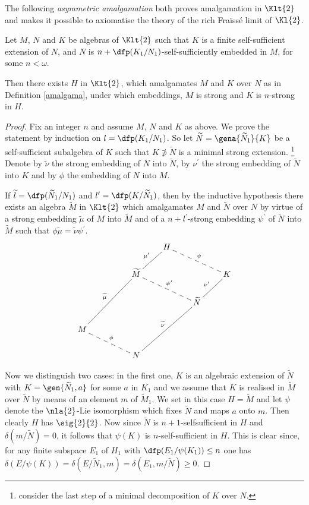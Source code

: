 The following {\em asymmetric amalgamation} both proves amalgamation in $\Klt{2}$ and makes it possible to
axiomatise the theory of the rich Fra\"iss\'e limit of $\Kl{2}$.
\begin{lem}\label{asymalgadue}
Let $M$, $N$ and $K$ be algebras of $\Klt{2}$ %
such that $K$ is a finite self-sufficient extension of $N$, and $N$ is $n+\dfp(K_{1}/ N_{1})$-self-sufficiently
embedded in $M$, for some $n<\omega$.

Then there exists $H$ in $\Klt{2}$, %
which amalgamates $M$ and $K$ over $N$ as in Definition \ref{amalgama}, under which embeddings,
$M$ is strong and $K$ is $n$-strong in $H$.
\end{lem}
\begin{proof}
Fix an integer $n$ and assume $M$, $N$ and $K$ as above. We prove the
statement by induction on $l=\dfp(K_{1}/ N_{1})$. So let
$\widetilde{N}=\gena{\widetilde{N}_{1}}{K}$ be a self-sufficient
subalgebra of $K$ such that $K\nni\widetilde{N}$ is a minimal strong extension.
\footnote{consider the last step of a minimal decomposition of $K$ over $N$.}
Denote by $\widetilde{\nu}$ the strong embedding of
$N$ into $\widetilde{N}$, by $\nu^{\prime}$ the strong embedding of $\widetilde{N}$ into $K$
and by $\phi$ the embedding of $N$ into $M$.

If $\widetilde{l}=\dfp(\widetilde{N}_{1}/ N_{1})$ and
$l^{\prime}=\dfp(K/\widetilde{N}_{1})$, then by the inductive hypothesis there exists an
algebra $\widetilde{M}$ in $\Klt{2}$ which amalgamates $M$ and $\widetilde{N}$ over
$N$ by virtue of a strong embedding $\widetilde{\mu}$ of $M$ into $\widetilde{M}$
and of a $n+l^{\prime}$-strong embedding $\psi^{\prime}$ of $\widetilde{N}$ into $\widetilde{M}$ such that $\phi\widetilde{\mu}=\widetilde{\nu}\psi^{\prime}$.
$$
\xymatrix@C-1mm@R-2mm{
&&&H\ar@{-}[dl]_{\mu^{\prime}}\ar@{--}[drr]^{\psi}&&\\
&&\widetilde{M}\ar@{--}[drr]^{\psi^{\prime}}&&&K\ar@{-}[dl]_{\nu^{\prime}}\\
&&&&\widetilde{N}&\\
M\ar@{-}[uurr]^{\widetilde{\mu}}\ar@{--}[drr]^{\phi}&&&&&\\
&&N\ar@{-}[uurr]^{\widetilde{\nu}}&&&}
$$

Now we distinguish two cases: in the first one, $K$ is an algebraic extension of $\widetilde{N}$
with $K=\gen{\widetilde{N}_{1},a}$ for some $a$ in $K_{1}$ and
we assume that $K$ is realised in $\widetilde{M}$ over $\widetilde{N}$ by means of
an element $m$ of $\widetilde{M}_{1}$. We set in this case $H=\widetilde{M}$ and
let $\psi$ denote the $\nla{2}$-Lie isomorphism which fixes $\widetilde{N}$ and
maps $a$ onto $m$. Then clearly $H$ has $\sig{2}{2}$.
Now since $\widetilde{N}$ is $n+1$-selfsufficient
in $H$ and $\delta(m/\widetilde{N})=0$, it follows that
$\psi(K)$ is $n$-self-sufficient in $H$. This is clear since,
for any finite subspace $E_{1}$ of $H_{1}$ with $\dfp(E_{1}/\psi(K_{1}))\leq n$
one has $\delta(E/\psi(K))=\delta(E/\widetilde{N}_{1},m)=
\delta(E_{1},m/\widetilde{N}) %
\geq0$.


\end{proof}
